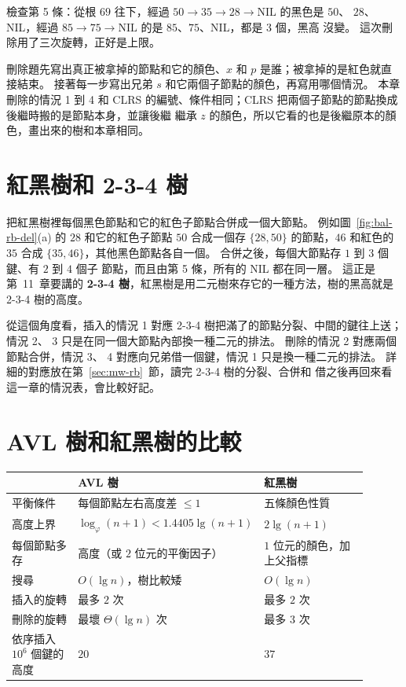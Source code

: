 檢查第 5 條：從根 $69$ 往下，經過 $50 \to 35 \to 28 \to \text{NIL}$ 的黑色是 $50$、
$28$、NIL，經過 $85 \to 75 \to \text{NIL}$ 的是 $85$、$75$、NIL，都是 $3$ 個，黑高
沒變。 這次刪除用了三次旋轉，正好是上限。

\begin{examnote}
刪除題先寫出真正被拿掉的節點和它的顏色、$x$ 和 $p$ 是誰；被拿掉的是紅色就直接結束。
接著每一步寫出兄弟 $s$ 和它兩個子節點的顏色，再寫用哪個情況。 本章刪除的情況 1 到 4
和 CLRS 的編號、條件相同；CLRS 把兩個子節點的節點換成後繼時搬的是節點本身，並讓後繼
繼承 $z$ 的顏色，所以它看的也是後繼原本的顏色，畫出來的樹和本章相同。
\end{examnote}

\section{紅黑樹和 2-3-4 樹}
\label{sec:bal-234}

把紅黑樹裡每個黑色節點和它的紅色子節點合併成一個大節點。 例如圖~\ref{fig:bal-rb-del}(a)
的 $28$ 和它的紅色子節點 $50$ 合成一個存 $\{28, 50\}$ 的節點，$46$ 和紅色的 $35$ 合成
$\{35, 46\}$，其他黑色節點各自一個。 合併之後，每個大節點存 $1$ 到 $3$ 個鍵、有 $2$ 到 $4$ 個子
節點，而且由第 5 條，所有的 NIL 都在同一層。 這正是第~11~章要講的 \textbf{2-3-4
樹}，紅黑樹是用二元樹來存它的一種方法，樹的黑高就是 2-3-4 樹的高度。

從這個角度看，插入的情況 1 對應 2-3-4 樹把滿了的節點分裂、中間的鍵往上送；情況 2、
3 只是在同一個大節點內部換一種二元的排法。 刪除的情況 2 對應兩個節點合併，情況 3、
4 對應向兄弟借一個鍵，情況 1 只是換一種二元的排法。 詳細的對應放在第~\ref{sec:mw-rb}~節，讀完 2-3-4 樹的分裂、合併和
借之後再回來看這一章的情況表，會比較好記。

\section{AVL 樹和紅黑樹的比較}
\label{sec:bal-compare}

\begin{center}
\begin{tabular}{p{0.24\linewidth}p{0.33\linewidth}p{0.33\linewidth}}
\toprule
 & AVL 樹 & 紅黑樹 \\
\midrule
平衡條件 & 每個節點左右高度差 $\le 1$ & 五條顏色性質 \\
高度上界 & $\log_\varphi(n+1) < 1.4405\lg(n+1)$ & $2\lg(n+1)$ \\
每個節點多存 & 高度（或 $2$ 位元的平衡因子） & $1$ 位元的顏色，加上父指標 \\
搜尋 & $O(\lg n)$，樹比較矮 & $O(\lg n)$ \\
插入的旋轉 & 最多 $2$ 次 & 最多 $2$ 次 \\
刪除的旋轉 & 最壞 $\Theta(\lg n)$ 次 & 最多 $3$ 次 \\
依序插入 $10^6$ 個鍵的高度 & $20$ & $37$ \\
\bottomrule
\end{tabular}
\end{center}

